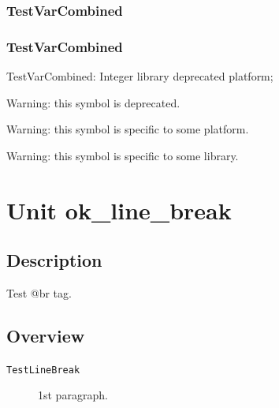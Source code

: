 \documentclass{report}
\newif\ifpdf
\begin{document}
\subsection*{\large{\textbf{TestVarCombined}}\normalsize\hspace{1ex}\hrulefill}
\else
\subsection*{TestVarCombined}
\fi
\label{ok_hint_directives-TestVarCombined}
\begin{list}{}{
\setlength{\itemindent}{0cm}
\setlength{\listparindent}{0cm}
\setlength{\leftmargin}{\evensidemargin}
\addtolength{\leftmargin}{\tmplength}
\settowidth{\labelsep}{X}
\addtolength{\leftmargin}{\labelsep}
\setlength{\labelwidth}{\tmplength}
}
\item[\textbf{Declaration}\hfill]
\ifpdf
\begin{flushleft}
\fi
\begin{ttfamily}
TestVarCombined: Integer library deprecated platform;\end{ttfamily}

\ifpdf
\end{flushleft}
\fi

\par
\item[\textbf{Description}]
Warning: this symbol is deprecated.

Warning: this symbol is specific to some platform.

Warning: this symbol is specific to some library.

 

\end{list}
\chapter{Unit ok{\_}line{\_}break}
\label{ok_line_break}
\section{Description}
Test @br tag.
\section{Overview}
\begin{description}
\item[\texttt{TestLineBreak}]1st paragraph.
\end{description}
\end{document}
